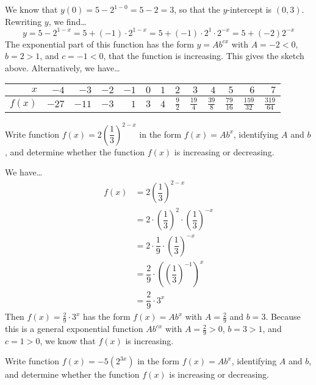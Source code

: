 \documentclass[11pt,letterpaper]{article}
\begin{document}
We know that $y(0)= 5 - 2^{1 - 0}= 5 - 2= 3$, so that the $y$-intercept is $(0, 3)$. Rewriting $y$, we find\dots
	\[
	y= 5 - 2^{1 - x}= 5 + (-1) \cdot 2^{1 - x}= 5 + (-1) \cdot 2^1 \cdot 2^{-x}= 5 + (-2) 2^{-x}
	\]
The exponential part of this function has the form $y= Ab^{cx}$ with $A= -2 < 0$, $b= 2 > 1$, and $c= -1 < 0$, that the function is increasing. This gives the sketch above. Alternatively, we have\dots
	\begin{table}[!ht]
	\centering
	\begin{tabular}{r|rrrrrrrrrrrr}
	$x$ & $-4$ & $-3$ & $-2$ & $-1$ & $0$ & $1$ & $2$ & $3$ & $4$ & $5$ & $6$ & $7$ \\ \hline
	$f(x)$ & $-27$ & $-11$ & $-3$ & $1$ & $3$ & $4$ & $\frac{9}{2}$ & $\frac{19}{4}$ & $\frac{39}{8}$ & $\frac{79}{16}$ & $\frac{159}{32}$ & $\frac{319}{64}$
	\end{tabular}
	\end{table}



\newpage



 Write function $f(x)=  2 \left( \dfrac{1}{3} \right)^{2 - x}$ in the form $f(x)= Ab^x$, identifying $A$ and $b$, and determine whether the function $f(x)$ is increasing or decreasing. \pspace

\sol We have\dots
	\[
	\begin{aligned}
	f(x)&= 2 \left( \dfrac{1}{3} \right)^{2 - x} \\[0.3cm]
	&= 2 \cdot \left( \dfrac{1}{3} \right)^2 \cdot \left( \dfrac{1}{3} \right)^{-x} \\[0.3cm]
	&= 2 \cdot \dfrac{1}{9} \cdot \left( \dfrac{1}{3} \right)^{-x} \\[0.3cm]
	&= \dfrac{2}{9} \cdot \left(\left( \dfrac{1}{3} \right)^{-1} \right)^x \\[0.3cm]
	&= \dfrac{2}{9} \cdot 3^x 
	\end{aligned}
	\] \pspace
Then $f(x)= \frac{2}{9} \cdot 3^x$ has the form $f(x)= Ab^x$ with $A= \frac{2}{9}$ and $b= 3$. Because this is a general exponential function $Ab^{cx}$ with $A= \frac{2}{9} > 0$, $b= 3 > 1$, and $c= 1 > 0$, we know that $f(x)$ is increasing. 



\newpage



 Write function $f(x)= -5(2^{3x})$ in the form $f(x)= Ab^x$, identifying $A$ and $b$, and determine whether the function $f(x)$ is increasing or decreasing. \pspace
\end{document}
